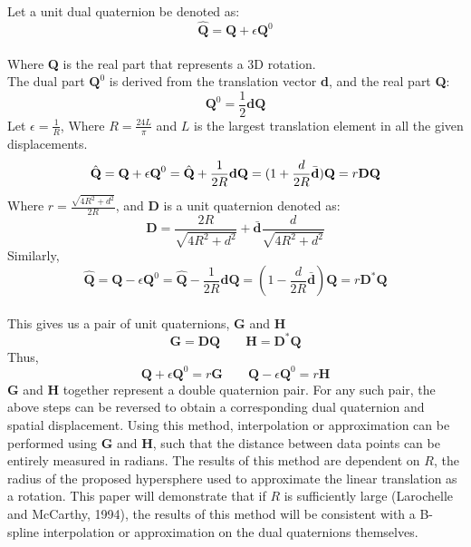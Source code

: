 \documentclass[11pt]{article}
\begin{document}
\\
\\
Let a unit dual quaternion be denoted as: $$\hat{\textbf{Q}} = \textbf{Q} + \epsilon\textbf{Q}^0$$
\\
Where \textbf{Q} is the real part that represents a 3D rotation.
\\
The dual part $\textbf{Q}^0$ is derived from the translation vector \textbf{d}, and the real part \textbf{Q}:
\\
$$ \textbf{Q}^0 = \frac{1}{2}\textbf{d}\textbf{Q}$$
Let $\epsilon = \frac{1}{R}$, Where $R = \frac{24L}{\pi}$ and $L$ is the largest translation element in all the given displacements.
$$\hat{\textbf{Q}} = \textbf{Q} + \epsilon\textbf{Q}^0 = \hat{\textbf{Q}} + \frac{1}{2R}\textbf{d}\textbf{Q} = (1+\frac{d}{2R}\bar{\textbf{d}})\textbf{Q} = r\textbf{D\textbf{Q}}$$
Where $ r = \frac{\sqrt{4R^2+d^2}}{2R}$, and \textbf{D} is a unit quaternion denoted as:
$$\textbf{D} = \frac{2R}{\sqrt{4R^2+d^2}}+\bar{\textbf{d}}\frac{d}{\sqrt{4R^2+d^2}}$$
Similarly,
$$\hat{\textbf{Q}} = \textbf{Q} - \epsilon\textbf{Q}^0 = \hat{\textbf{Q}} - \frac{1}{2R}\textbf{d}\textbf{Q} = (1-\frac{d}{2R}\bar{\textbf{d}})\textbf{Q} = r\textbf{D}^\ast\textbf{Q}$$
\\
This gives us a pair of unit quaternions, \textbf{G} and \textbf{H}
$$ \textbf{G} = \textbf{D}\textbf{Q} \qquad \textbf{H} = \textbf{D}^\ast\textbf{Q}$$
Thus,
$$\textbf{Q}+\epsilon\textbf{Q}^0 = r\textbf{G} \qquad \textbf{Q}-\epsilon\textbf{Q}^0 = r\textbf{H}$$
\textbf{G} and \textbf{H} together represent a double quaternion pair. For any such pair, the above steps can be reversed to obtain a corresponding dual quaternion and spatial displacement. Using this method, interpolation or approximation can be performed using \textbf{G} and \textbf{H}, such that the distance between data points can be entirely measured in radians. The results of this method are dependent on $R$, the radius of the proposed hypersphere used to approximate the linear translation as a rotation. This paper will demonstrate that if $R$ is sufficiently large (Larochelle and McCarthy, 1994), the results of this method will be consistent with a B-spline interpolation or approximation on the dual quaternions themselves.
\\
\\
\newpage
\end{document}
